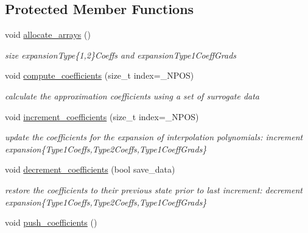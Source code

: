 \subsection*{Protected Member Functions}
\begin{DoxyCompactItemize}
\item 
void \hyperlink{classPecos_1_1NodalInterpPolyApproximation_a37ef37829b412fefa40d53b395846781}{allocate\+\_\+arrays} ()\label{classPecos_1_1NodalInterpPolyApproximation_a37ef37829b412fefa40d53b395846781}

\begin{DoxyCompactList}\small\item\em size expansion\+Type\{1,2\}Coeffs and expansion\+Type1\+Coeff\+Grads \end{DoxyCompactList}\item 
void \hyperlink{classPecos_1_1NodalInterpPolyApproximation_aef8f0c32bdeff7756a9c614607c03058}{compute\+\_\+coefficients} (size\+\_\+t index=\+\_\+\+N\+P\+OS)\label{classPecos_1_1NodalInterpPolyApproximation_aef8f0c32bdeff7756a9c614607c03058}

\begin{DoxyCompactList}\small\item\em calculate the approximation coefficients using a set of surrogate data \end{DoxyCompactList}\item 
void \hyperlink{classPecos_1_1NodalInterpPolyApproximation_a8ba12605934048176c1d1c5722465523}{increment\+\_\+coefficients} (size\+\_\+t index=\+\_\+\+N\+P\+OS)\label{classPecos_1_1NodalInterpPolyApproximation_a8ba12605934048176c1d1c5722465523}

\begin{DoxyCompactList}\small\item\em update the coefficients for the expansion of interpolation polynomials\+: increment expansion\{Type1\+Coeffs,Type2\+Coeffs,Type1\+Coeff\+Grads\} \end{DoxyCompactList}\item 
void \hyperlink{classPecos_1_1NodalInterpPolyApproximation_a662fd880fee0ed53f1e3383c41d6b792}{decrement\+\_\+coefficients} (bool save\+\_\+data)\label{classPecos_1_1NodalInterpPolyApproximation_a662fd880fee0ed53f1e3383c41d6b792}

\begin{DoxyCompactList}\small\item\em restore the coefficients to their previous state prior to last increment\+: decrement expansion\{Type1\+Coeffs,Type2\+Coeffs,Type1\+Coeff\+Grads\} \end{DoxyCompactList}\item 
void \hyperlink{classPecos_1_1NodalInterpPolyApproximation_a150c32326f6c12d2303806005715706e}{push\+\_\+coefficients} ()\label{classPecos_1_1NodalInterpPolyApproximation_a150c32326f6c12d2303806005715706e}


\end{DoxyCompactItemize}
